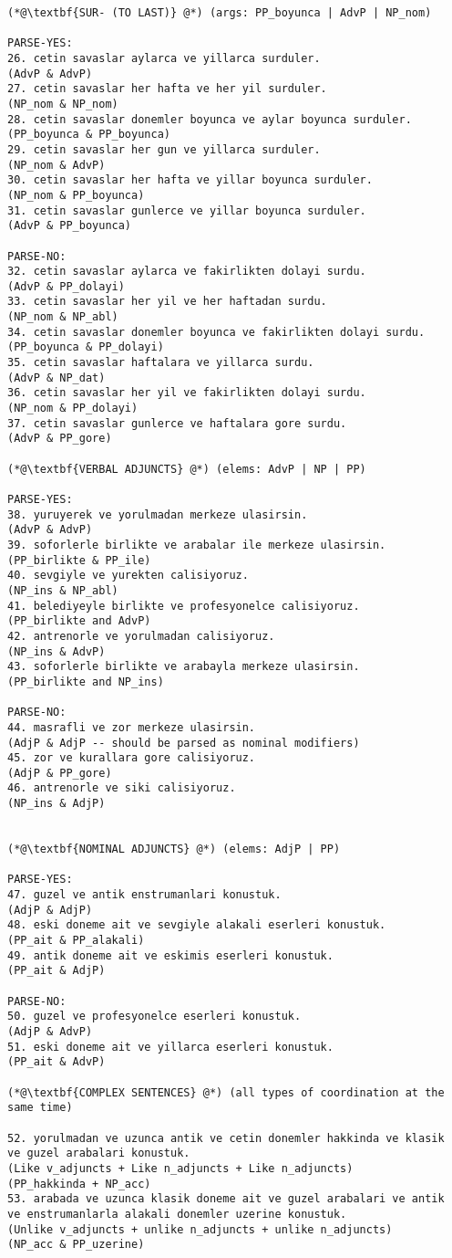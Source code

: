 \begin{lstlisting}
(*@\textbf{SUR- (TO LAST)} @*) (args: PP_boyunca | AdvP | NP_nom)

PARSE-YES:
26. cetin savaslar aylarca ve yillarca surduler.
(AdvP & AdvP)
27. cetin savaslar her hafta ve her yil surduler.
(NP_nom & NP_nom)
28. cetin savaslar donemler boyunca ve aylar boyunca surduler. 
(PP_boyunca & PP_boyunca)
29. cetin savaslar her gun ve yillarca surduler. 
(NP_nom & AdvP)
30. cetin savaslar her hafta ve yillar boyunca surduler.
(NP_nom & PP_boyunca)
31. cetin savaslar gunlerce ve yillar boyunca surduler.
(AdvP & PP_boyunca)

PARSE-NO:
32. cetin savaslar aylarca ve fakirlikten dolayi surdu.
(AdvP & PP_dolayi)
33. cetin savaslar her yil ve her haftadan surdu.
(NP_nom & NP_abl)
34. cetin savaslar donemler boyunca ve fakirlikten dolayi surdu.
(PP_boyunca & PP_dolayi)
35. cetin savaslar haftalara ve yillarca surdu.
(AdvP & NP_dat)
36. cetin savaslar her yil ve fakirlikten dolayi surdu.
(NP_nom & PP_dolayi)
37. cetin savaslar gunlerce ve haftalara gore surdu.
(AdvP & PP_gore)

(*@\textbf{VERBAL ADJUNCTS} @*) (elems: AdvP | NP | PP)

PARSE-YES:
38. yuruyerek ve yorulmadan merkeze ulasirsin.
(AdvP & AdvP)
39. soforlerle birlikte ve arabalar ile merkeze ulasirsin.
(PP_birlikte & PP_ile)
40. sevgiyle ve yurekten calisiyoruz.
(NP_ins & NP_abl)
41. belediyeyle birlikte ve profesyonelce calisiyoruz.
(PP_birlikte and AdvP)
42. antrenorle ve yorulmadan calisiyoruz.
(NP_ins & AdvP)
43. soforlerle birlikte ve arabayla merkeze ulasirsin.
(PP_birlikte and NP_ins)

PARSE-NO:
44. masrafli ve zor merkeze ulasirsin.
(AdjP & AdjP -- should be parsed as nominal modifiers)
45. zor ve kurallara gore calisiyoruz.
(AdjP & PP_gore)
46. antrenorle ve siki calisiyoruz.
(NP_ins & AdjP)


(*@\textbf{NOMINAL ADJUNCTS} @*) (elems: AdjP | PP)

PARSE-YES:
47. guzel ve antik enstrumanlari konustuk. 
(AdjP & AdjP)
48. eski doneme ait ve sevgiyle alakali eserleri konustuk.
(PP_ait & PP_alakali)
49. antik doneme ait ve eskimis eserleri konustuk.
(PP_ait & AdjP)

PARSE-NO:
50. guzel ve profesyonelce eserleri konustuk.
(AdjP & AdvP)
51. eski doneme ait ve yillarca eserleri konustuk.
(PP_ait & AdvP)

(*@\textbf{COMPLEX SENTENCES} @*) (all types of coordination at the same time)

52. yorulmadan ve uzunca antik ve cetin donemler hakkinda ve klasik 
ve guzel arabalari konustuk.
(Like v_adjuncts + Like n_adjuncts + Like n_adjuncts)
(PP_hakkinda + NP_acc)
53. arabada ve uzunca klasik doneme ait ve guzel arabalari ve antik 
ve enstrumanlarla alakali donemler uzerine konustuk.
(Unlike v_adjuncts + unlike n_adjuncts + unlike n_adjuncts)
(NP_acc & PP_uzerine)

\end{lstlisting}


